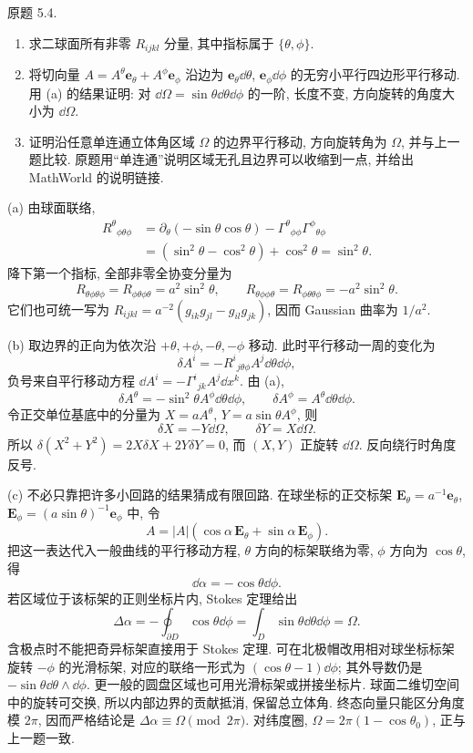 \begin{exercise}
原题 5.4.
\begin{enumerate}[label=(\alph*)]
\item 求二球面所有非零 $R_{ijkl}$ 分量, 其中指标属于 $\{\theta,\phi\}$.
\item 将切向量 $A=A^\theta\boldsymbol e_\theta+A^\phi\boldsymbol e_\phi$ 沿边为 $\boldsymbol e_\theta\dd\theta$, $\boldsymbol e_\phi\dd\phi$ 的无穷小平行四边形平行移动. 用 (a) 的结果证明: 对 $\dd\Omega=\sin\theta\dd\theta\dd\phi$ 的一阶, 长度不变, 方向旋转的角度大小为 $\dd\Omega$.
\item 证明沿任意单连通立体角区域 $\Omega$ 的边界平行移动, 方向旋转角为 $\Omega$, 并与上一题比较. 原题用“单连通”说明区域无孔且边界可以收缩到一点, 并给出 MathWorld 的说明链接.
\end{enumerate}
\end{exercise}
\begin{solution}
(a) 由球面联络,
\begin{align*}
R^\theta{}_{\phi\theta\phi}
&=\partial_\theta(-\sin\theta\cos\theta)
-\Gamma^\theta{}_{\phi\phi}\Gamma^\phi{}_{\theta\phi}\\
&=(\sin^2\theta-\cos^2\theta)+\cos^2\theta=\sin^2\theta.
\end{align*}
降下第一个指标, 全部非零全协变分量为
\[
R_{\theta\phi\theta\phi}=R_{\phi\theta\phi\theta}=a^2\sin^2\theta,
\qquad
R_{\theta\phi\phi\theta}=R_{\phi\theta\theta\phi}=-a^2\sin^2\theta.
\]
它们也可统一写为 $R_{ijkl}=a^{-2}(g_{ik}g_{jl}-g_{il}g_{jk})$, 因而 Gaussian 曲率为 $1/a^2$.

(b) 取边界的正向为依次沿 $+\theta,+\phi,-\theta,-\phi$ 移动. 此时平行移动一周的变化为
\[
\delta A^i=-R^i{}_{j\theta\phi}A^j\dd\theta\dd\phi,
\]
负号来自平行移动方程 $\dd A^i=-\Gamma^i{}_{jk}A^j\dd x^k$. 由 (a),
\[
\delta A^\theta=-\sin^2\theta A^\phi\dd\theta\dd\phi,
\qquad
\delta A^\phi=A^\theta\dd\theta\dd\phi.
\]
令正交单位基底中的分量为 $X=aA^\theta$, $Y=a\sin\theta A^\phi$, 则
\[
\delta X=-Y\dd\Omega,\qquad \delta Y=X\dd\Omega.
\]
所以 $\delta(X^2+Y^2)=2X\delta X+2Y\delta Y=0$, 而 $(X,Y)$ 正旋转 $\dd\Omega$. 反向绕行时角度反号.

(c) 不必只靠把许多小回路的结果猜成有限回路. 在球坐标的正交标架 $\boldsymbol E_\theta=a^{-1}\boldsymbol e_\theta$, $\boldsymbol E_\phi=(a\sin\theta)^{-1}\boldsymbol e_\phi$ 中, 令
\[
A=|A|(\cos\alpha\,\boldsymbol E_\theta+\sin\alpha\,\boldsymbol E_\phi).
\]
把这一表达代入一般曲线的平行移动方程, $\theta$ 方向的标架联络为零, $\phi$ 方向为 $\cos\theta$, 得
\[
\dd\alpha=-\cos\theta\dd\phi.
\]
若区域位于该标架的正则坐标片内, Stokes 定理给出
\[
\Delta\alpha=-\oint_{\partial D}\cos\theta\dd\phi
=\int_D\sin\theta\dd\theta\dd\phi=\Omega.
\]
含极点时不能把奇异标架直接用于 Stokes 定理. 可在北极帽改用相对球坐标标架旋转 $-\phi$ 的光滑标架, 对应的联络一形式为 $(\cos\theta-1)\dd\phi$; 其外导数仍是 $-\sin\theta\dd\theta\wedge\dd\phi$. 更一般的圆盘区域也可用光滑标架或拼接坐标片. 球面二维切空间中的旋转可交换, 所以内部边界的贡献抵消, 保留总立体角. 终态向量只能区分角度模 $2\pi$, 因而严格结论是 $\Delta\alpha\equiv\Omega\pmod{2\pi}$. 对纬度圈, $\Omega=2\pi(1-\cos\theta_0)$, 正与上一题一致.
\end{solution}

